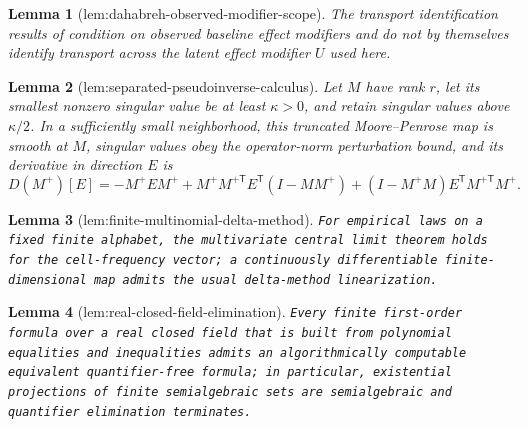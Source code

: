 \documentclass{article}
\newtheorem{lemma}{Lemma}
\begin{document}
\begin{lemma}[lem:dahabreh-observed-modifier-scope]\label{lem:dahabreh-observed-modifier-scope}
The transport identification results of \cite{DahabrehRobertsonPetitoHernanSteingrimsson2023} condition on observed baseline effect modifiers and do not by themselves identify transport across the latent effect modifier \(U\) used here.
\end{lemma}

\begin{lemma}[lem:separated-pseudoinverse-calculus]\label{lem:separated-pseudoinverse-calculus}
Let \(M\) have rank \(r\), let its smallest nonzero singular value be at least \(\kappa>0\), and retain singular values above \(\kappa/2\).  In a sufficiently small neighborhood, this truncated Moore--Penrose map is smooth at \(M\), singular values obey the operator-norm perturbation bound, and its derivative in direction \(E\) is
\[
D(M^+)[E]=-M^+EM^++M^+M^{+\mathsf T}E^{\mathsf T}(I-MM^+)
+(I-M^+M)E^{\mathsf T}M^{+\mathsf T}M^+.
\]
\end{lemma}

\begin{lemma}[lem:finite-multinomial-delta-method]\label{lem:finite-multinomial-delta-method}
\texttt{For empirical laws on a fixed finite alphabet,\allowbreak{} the multivariate central limit theorem holds for the cell-\allowbreak{}frequency vector;\allowbreak{} a continuously differentiable finite-\allowbreak{}dimensional map admits the usual delta-\allowbreak{}method linearization.}
\end{lemma}

\begin{lemma}[lem:real-closed-field-elimination]\label{lem:real-closed-field-elimination}
\texttt{Every finite first-\allowbreak{}order formula over a real closed field that is built from polynomial equalities and inequalities admits an algorithmically computable equivalent quantifier-\allowbreak{}free formula;\allowbreak{} in particular,\allowbreak{} existential projections of finite semialgebraic sets are semialgebraic and quantifier elimination terminates.}
\end{lemma}
\end{document}
